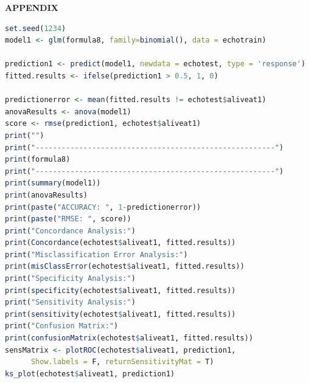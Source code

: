 \documentclass[11pt]{article}
\begin{document}
\newpage
{\bf APPENDIX}
\begin{lstlisting}[language=R, label=LogisticModel, caption=Building Logistic Model and Validating (Snippet), frame=htbp]
set.seed(1234)
model1 <- glm(formula8, family=binomial(), data = echotrain)

prediction1 <- predict(model1, newdata = echotest, type = 'response')
fitted.results <- ifelse(prediction1 > 0.5, 1, 0)

predictionerror <- mean(fitted.results != echotest$aliveat1)
anovaResults <- anova(model1)
score <- rmse(prediction1, echotest$aliveat1)
print("")
print("-------------------------------------------------------")
print(formula8)
print("-------------------------------------------------------")
print(summary(model1))
print(anovaResults)
print(paste("ACCURACY: ", 1-predictionerror))
print(paste("RMSE: ", score))
print("Concordance Analysis:")
print(Concordance(echotest$aliveat1, fitted.results))
print("Misclassification Error Analysis:")
print(misClassError(echotest$aliveat1, fitted.results))
print("Specificity Analysis:")
print(specificity(echotest$aliveat1, fitted.results))
print("Sensitivity Analysis:")
print(sensitivity(echotest$aliveat1, fitted.results))
print("Confusion Matrix:")
print(confusionMatrix(echotest$aliveat1, fitted.results))
sensMatrix <- plotROC(echotest$aliveat1, prediction1, 
      Show.labels = F, returnSensitivityMat = T)
ks_plot(echotest$aliveat1, prediction1)

\end{lstlisting}
\end{document}
